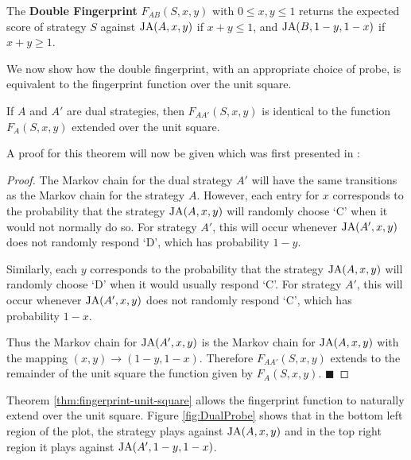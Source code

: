 
\begin{definition}\label{def:double-fingerprint}
The \textbf{Double Fingerprint} $F_{AB}(S, x, y)$ with $0 \leq x, y \leq 1$ returns the expected score of strategy $S$ against $\text{JA}(A, x, y)$ if $x+y \leq 1$, and $\text{JA}(B, 1-y, 1-x)$ if $x+y \geq 1$.
\end{definition}

We now show how the double fingerprint, with an appropriate choice of probe, is equivalent to the fingerprint function over the unit square.

\begin{theorem}\label{thm:fingerprint-unit-square}
If $A$ and $A'$ are dual strategies, then $F_{AA'}(S, x, y)$ is identical to the function $F_A(S, x, y)$ extended over the unit square.
\end{theorem}

A proof for this theorem will now be given which was first presented in \cite{Ashlock2004}:
\begin{proof}\label{prf:fingerprint-unit-square}
The Markov chain for the dual strategy $A'$ will have the same transitions as the Markov chain for the strategy $A$.
However, each entry for $x$ corresponds to the probability that the strategy $\text{JA}(A, x, y)$ will randomly choose `C' when it would not normally do so.
For strategy $A'$, this will occur whenever $\text{JA}(A', x, y)$ does not randomly respond `D', which has probability $1 - y$.

Similarly, each $y$ corresponds to the probability that the strategy $\text{JA}(A, x, y)$ will randomly choose `D' when it would usually respond `C'.
For strategy $A'$, this will occur whenever $\text{JA}(A', x, y)$ does not randomly respond `C', which has probability $1 - x$.

Thus the Markov chain for $\text{JA}(A', x, y)$ is the Markov chain for $\text{JA}(A, x, y)$ with the mapping $(x, y) \rightarrow (1-y, 1-x)$.
Therefore $F_{AA'}(S, x, y)$ extends to the remainder of the unit square the function given by $F_A(S, x, y)$. $\blacksquare$
\end{proof}

Theorem \ref{thm:fingerprint-unit-square} allows the fingerprint function to naturally extend over the unit square.
Figure \ref{fig:DualProbe} shows that in the \textcolor{sol-violet}{bottom left} region of the plot, the strategy plays against $\text{JA}(A, x, y)$ and in the \textcolor{sol-cyan}{top right} region it plays against $\text{JA}(A', 1-y, 1-x)$.

